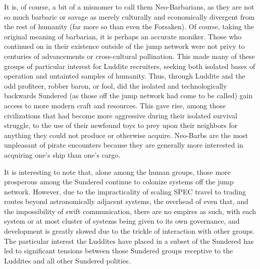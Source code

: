 It is, of course, a bit of a misnomer to call them Neo-Barbarians, as
they are not so much barbaric or savage as merely culturally and
economically divergent from the rest of humanity (far more so than
even the Forsaken). Of course, taking the original meaning of
barbarian, it is perhaps an accurate moniker. Those who continued on
in their existence outside of the jump network were not privy to
centuries of advancements or cross-cultural pollination. This made
many of these groups of particular interest for Luddite recruiters,
seeking both isolated bases of operation and untainted samples of
humanity. Thus, through Luddite and the odd profiteer, robber baron,
or fool, did the isolated and technologically backwards Sundered (as
those off the jump network had come to be called) gain access to more
modern craft and resources. This gave rise, among those civilizations
that had become more aggressive during their isolated survival
struggle, to the use of their newfound toys to prey upon their
neighbors for anything they could not produce or otherwise
acquire. Neo-Barbs are the most unpleasant of pirate encounters
because they are generally more interested in acquiring one's ship
than one's cargo.

It is interesting to note that, alone among the human groups, those
more prosperous among the Sundered continue to colonize systems off
the jump network. However, due to the impracticality of scaling SPEC
travel to trading routes beyond astronomically adjacent systems, the
overhead of even that, and the impossibility of swift communication,
there are no empires as such, with each system or at most cluster of
systems being given to its own governance, and development is greatly
slowed due to the trickle of interaction with other groups. The
particular interest the Luddites have placed in a subset of the
Sundered has led to significant tensions between those Sundered groups
receptive to the Luddites and all other Sundered polities.


